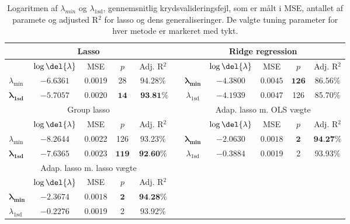 \begin{table}[ht]
\center
\begin{tabular}{lcccc | lccccc}
\toprule
   \multicolumn{5}{c}{Lasso} & \multicolumn{1}{c}{ }&  \multicolumn{5}{c}{Ridge regression}  \\ \midrule
 & \(\log \del{\lambda}\) & MSE & $p$ & Adj. R$^2$ &&& \(\log \del{\lambda}\) & MSE & $p$ & Adj. R$^2$\\
 $\lambda_{\min}$ &$-6.6361$& 0.0019 & 28 & 94.28\% &&  $\boldsymbol{\lambda_{\min}}$ &  $\mathbf{-4.3800}$ &   $\mathbf{0.0045} $&  $\mathbf{126}$ & $ \mathbf{86.56 \% }$ \\ 
 $\boldsymbol{\lambda}_{\textbf{1sd}}$ & $\mathbf{-5.7057}$ & $\mathbf{0.0020} $ & $\mathbf{14}$ &$\textbf{ 93.81} \boldsymbol{\%}$ && $\lambda_{ \text{1sd}}$& $-4.1939$ & 0.0047 & 126 &  85.70\%  \\ \bottomrule \toprule
\multicolumn{5}{c}{Group lasso}  &&  \multicolumn{5}{c}{Adap. lasso m. OLS vægte}  \\ \midrule
& \(\log \del{\lambda}\) & MSE &$ p $ &Adj. R$^2$ &&& \(\log \del{\lambda}\) & MSE & $p$ & Adj. R$^2$ \\
$\lambda_{\min}$& $-8.2644$ & 0.0022  & 126 & 93.23\% && $\boldsymbol{\lambda_{\min}}$  & $\mathbf{-2.0630}$ &$ \mathbf{0.0018}$ & $\mathbf{2}$ & $\textbf{94.27} \%$ \\
  $\boldsymbol{\lambda}_{\textbf{1sd}}$  & $\mathbf{-7.6365}$ &$ \mathbf{0.0023}$ & $\mathbf{119}$ &$ \textbf{92.60} \%$ &&  $\lambda_{1\text{sd}}$ & $-0.3884$ & 0.0019 & 2 &  93.93\%\\  \bottomrule 
  \toprule
  \multicolumn{5}{c}{Adap. lasso m. lasso vægte}  \\ \cmidrule{1-5}
& \(\log \del{\lambda}\) & MSE & $p$ & Adj. R$^2$\\
$\boldsymbol{\lambda_{\min}}$   &  $ \mathbf{-2.3674}$ & $ \mathbf{0.0018} $& $ \mathbf{2}$ &   $\textbf{94.28} \%$ \\
$\lambda_{1\text{sd}}$  & $-0.2276$ & 0.0019 & 2 & 93.92\%\\ \cmidrule{1-5}
 \end{tabular}
\caption{Logaritmen af $\lambda_{min}$ og $\lambda_{1\text{sd}}$, gennemsnitlig krydsvalideringsfejl, som er målt i MSE, antallet af paramete og adjusted R$^2$ for lasso og dens generaliseringer. De valgte tuning parameter for hver metode er markeret med tykt.} \label{tab:cv_tab}
\end{table}
